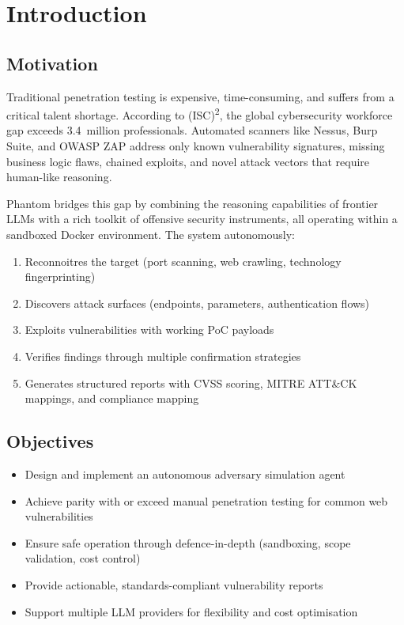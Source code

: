 \documentclass[11pt,a4paper]{article}
\begin{document}
\tableofcontents
\newpage

\section{Introduction}
\label{sec:intro}

\subsection{Motivation}
Traditional penetration testing is expensive, time-consuming, and suffers from
a critical talent shortage. According to (ISC)\textsuperscript{2}, the global
cybersecurity workforce gap exceeds 3.4~million professionals. Automated
scanners like Nessus, Burp Suite, and OWASP ZAP address only known
vulnerability signatures, missing business logic flaws, chained exploits, and
novel attack vectors that require human-like reasoning.

Phantom bridges this gap by combining the reasoning capabilities of frontier
LLMs with a rich toolkit of offensive security instruments, all operating within
a sandboxed Docker environment. The system autonomously:
\begin{enumerate}[noitemsep]
  \item Reconnoitres the target (port scanning, web crawling, technology fingerprinting)
  \item Discovers attack surfaces (endpoints, parameters, authentication flows)
  \item Exploits vulnerabilities with working PoC payloads
  \item Verifies findings through multiple confirmation strategies
  \item Generates structured reports with CVSS scoring, MITRE ATT\&CK mappings, and compliance mapping
\end{enumerate}

\subsection{Objectives}
\begin{itemize}[noitemsep]
  \item Design and implement an autonomous adversary simulation agent
  \item Achieve parity with or exceed manual penetration testing for common web vulnerabilities
  \item Ensure safe operation through defence-in-depth (sandboxing, scope validation, cost control)
  \item Provide actionable, standards-compliant vulnerability reports
  \item Support multiple LLM providers for flexibility and cost optimisation
\end{itemize}
\end{document}

